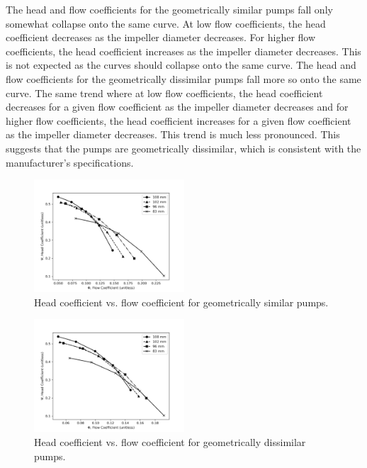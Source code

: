 The head and flow coefficients for the geometrically similar pumps fall only somewhat collapse onto the same curve. At low flow coefficients, the head coefficient decreases as the impeller diameter decreases. For higher flow coefficients, the head coefficient increases as the impeller diameter decreases. This is not expected as the curves should collapse onto the same curve. 
The head and flow coefficients for the geometrically dissimilar pumps fall more so onto the same curve. The same trend where at low flow coefficients, the head coefficient decreases for a given flow coefficient as the impeller diameter decreases and for higher flow coefficients, the head coefficient increases for a given flow coefficient as the impeller diameter decreases. This trend is much less pronounced. This suggests that the pumps are geometrically dissimilar, which is consistent with the manufacturer's specifications.
\begin{figure}[H]
    \centering
    \includegraphics[width=0.5\textwidth]{Sections/Figures/Geometrically Similar Pump Coefficients Plot.png}
    \caption{Head coefficient vs. flow coefficient for geometrically similar pumps.}
    \label{fig:geometric_similarity_head_coefficient}
\end{figure}
\begin{figure}[H]
    \centering
    \includegraphics[width=0.5\textwidth]{Sections/Figures/Geometrically Dissimilar Pump Coefficients Plot.png}
    \caption{Head coefficient vs. flow coefficient for geometrically dissimilar pumps.}
    \label{fig:geometric_dissimilarity_head_coefficient}
\end{figure}

